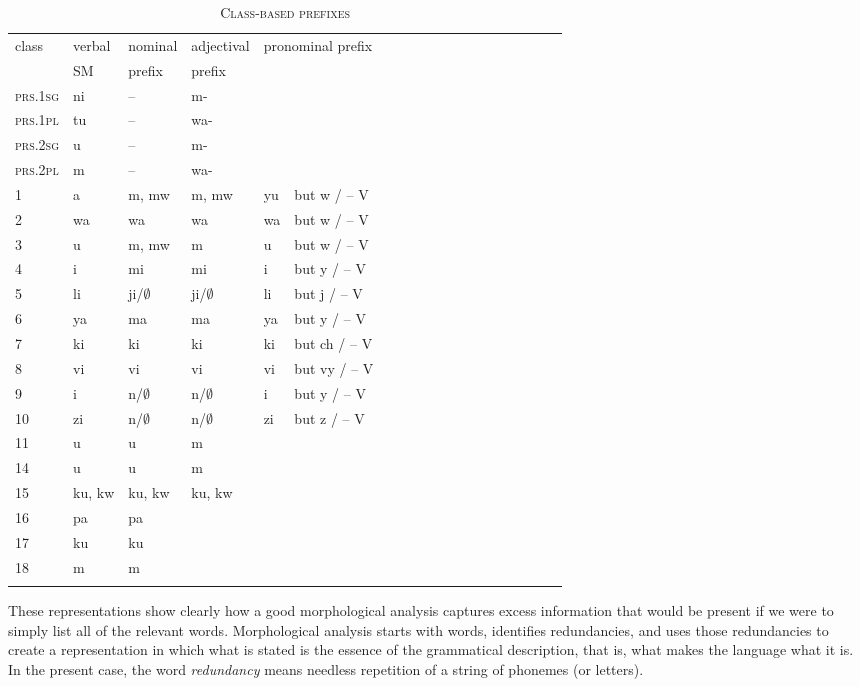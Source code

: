 \documentclass[output=paper,colorlinks,citecolor=brown,
]{langscibook}
\begin{document}
\begin{table}
\begin{tabular}{lllllllllllllllllll}\lsptoprule
class & verbal & nominal & adjectival   & \multicolumn{2}{l}{pronominal prefix} \\
&SM & prefix & prefix\\ \midrule
\textsc{prs.1sg} & ni &  --  & m- \\
\textsc{prs.1pl} & tu & --  & wa- \\
\textsc{prs.2sg} & u & --  &m-  \\
\textsc{prs.2pl} & m & -- & wa- \\
1 & a & m, mw  & m, mw & yu & but w / -- V \\
2 & wa & wa & wa & wa & but w / -- V\\
3 & u & m, mw & m & u&  but w / -- V \\
4 & i & mi & mi & i& but y / -- V  \\
5 & li & ji/$\emptyset$ & ji/$\emptyset$ & li & but j / -- V  \\
6 & ya & ma & ma & ya & but y / -- V  \\
7 & ki &ki & ki & ki & but ch / -- V \\
8 & vi & vi & vi & vi & but vy / -- V  \\
9 & i & n/$\emptyset$ & n/$\emptyset$  & i & but y / -- V  \\
10 & zi & n/$\emptyset$ & n/$\emptyset$  & zi & but z / -- V    \\
11 & u & u  & m  \\
14 & u & u & m \\
15 & ku, kw & ku, kw  & ku, kw\\ 
16 & pa & pa\\
17 & ku & ku \\
18 & m & m \\
\lspbottomrule
\end{tabular}
\caption{\textsc{Class-based prefixes}}
\label{class-based-system}
\end{table}
 
  
These representations show clearly how a good morphological analysis captures excess information that would be present if we were to simply list all of the relevant words. Morphological analysis starts with words, identifies redundancies, and uses those redundancies to create a representation in which what is stated is the essence of the grammatical description, that is, what makes the language what it is. In the present case, the word \textit{redundancy} means needless repetition of a string of phonemes (or letters).
\end{document}
